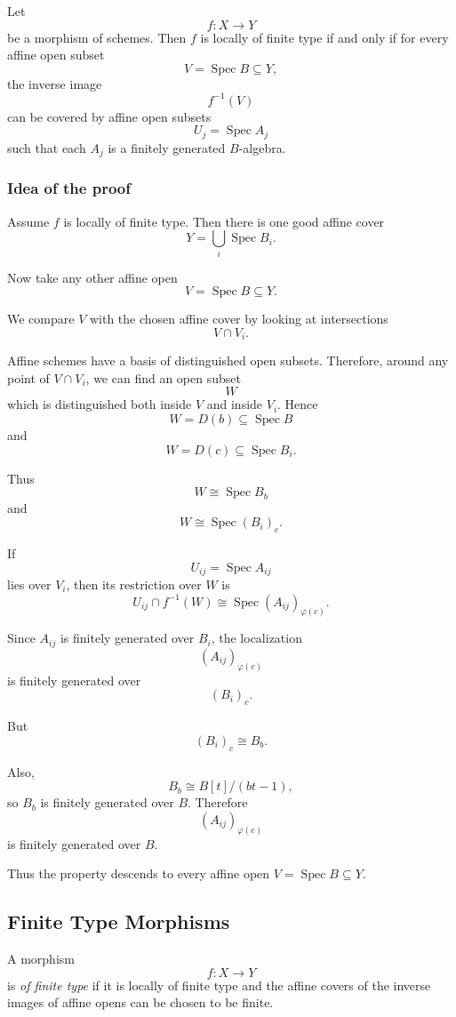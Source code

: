 \documentclass[12pt,a4paper]{article}
\theoremstyle{notespace}
\begin{document}
Let
\[
f:X\to Y
\]
be a morphism of schemes. Then \(f\) is locally of finite type if and only if for every affine open subset
\[
V=\operatorname{Spec}B\subseteq Y,
\]
the inverse image
\[
f^{-1}(V)
\]
can be covered by affine open subsets
\[
U_j=\operatorname{Spec}A_j
\]
such that each \(A_j\) is a finitely generated \(B\)-algebra.

\subsubsection*{Idea of the proof}

Assume \(f\) is locally of finite type. Then there is one good affine cover
\[
Y=\bigcup_i \operatorname{Spec}B_i.
\]

Now take any other affine open
\[
V=\operatorname{Spec}B\subseteq Y.
\]

We compare \(V\) with the chosen affine cover by looking at intersections
\[
V\cap V_i.
\]

Affine schemes have a basis of distinguished open subsets. Therefore, around any point of \(V\cap V_i\), we can find an open subset
\[
W
\]
which is distinguished both inside \(V\) and inside \(V_i\). Hence
\[
W=D(b)\subseteq \operatorname{Spec}B
\]
and
\[
W=D(c)\subseteq \operatorname{Spec}B_i.
\]

Thus
\[
W\cong \operatorname{Spec}B_b
\]
and
\[
W\cong \operatorname{Spec}(B_i)_c.
\]

If
\[
U_{ij}=\operatorname{Spec}A_{ij}
\]
lies over \(V_i\), then its restriction over \(W\) is
\[
U_{ij}\cap f^{-1}(W)
\cong
\operatorname{Spec}(A_{ij})_{\varphi(c)}.
\]

Since \(A_{ij}\) is finitely generated over \(B_i\), the localization
\[
(A_{ij})_{\varphi(c)}
\]
is finitely generated over
\[
(B_i)_c.
\]

But
\[
(B_i)_c\cong B_b.
\]

Also,
\[
B_b\cong B[t]/(bt-1),
\]
so \(B_b\) is finitely generated over \(B\). Therefore
\[
(A_{ij})_{\varphi(c)}
\]
is finitely generated over \(B\).

Thus the property descends to every affine open \(V=\operatorname{Spec}B\subseteq Y\).

\subsection{Finite Type Morphisms}

A morphism
\[
f:X\to Y
\]
is \emph{of finite type} if it is locally of finite type and the affine covers of the inverse images of affine opens can be chosen to be finite.
\end{document}
